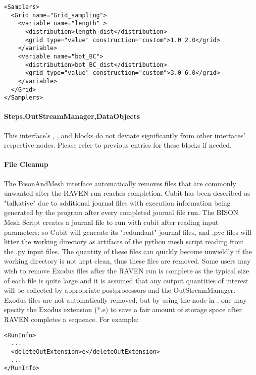 \begin{lstlisting}[style=XML]
<Samplers>
  <Grid name="Grid_sampling">
    <variable name="length" >
      <distribution>length_dist</distribution>
      <grid type="value" construction="custom">1.0 2.0</grid>
    </variable>
    <variable name="bot_BC">
      <distribution>bot_BC_dist</distribution>
      <grid type="value" construction="custom">3.0 6.0</grid>
    </variable>
  </Grid>
</Samplers>
\end{lstlisting}

\paragraph{Steps,OutStreamManager,DataObjects}
This interface's , , and
 blocks do not deviate significantly from
other interfaces' respective nodes.  Please refer to previous
entries for these blocks if needed.

\paragraph{File Cleanup}
The BisonAndMesh interface automatically removes files that are commonly
unwanted after the RAVEN run reaches completion. Cubit has been described as
"talkative" due to additional journal files with execution information
being generated by the program after every completed journal file run.
The BISON Mesh Script creates a journal file to run with cubit after reading input parameters;
so Cubit will generate its "redundant" journal files, and .pyc files will 
litter the working directory as artifacts of the python mesh script 
reading from the .py input files.  The quantity of these files can quickly 
become unwieldly if the working directory is not kept clean, thus these 
files are removed.  Some users
may wish to remove Exodus files after the RAVEN run is complete as
the typical size of each file is quite large and it is assumed that any
output quantities of interest will be collected by appropriate postprocessors
and the OutStreamManager.  Exodus files are not automatically removed,
but by using the  node in , one
may specify the Exodus extension (*.e) to save a fair amount of storage space
after RAVEN completes a sequence. For example:

\begin{lstlisting}[style=XML]
<RunInfo>
  ...
  <deleteOutExtension>e</deleteOutExtension>
  ...
</RunInfo>
\end{lstlisting}
